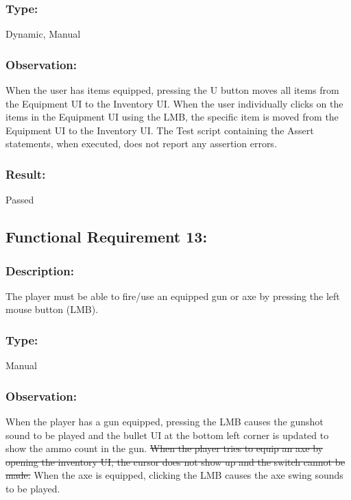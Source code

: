 \documentclass[12pt, titlepage]{article}
\begin{document}
\subsubsection{Type: } Dynamic, Manual

\subsubsection{Observation: } When the user has items equipped, pressing the U button moves all items from the Equipment UI to the Inventory UI. When the user individually clicks on the items in the Equipment UI using the LMB, the specific item is moved from the Equipment UI to the Inventory UI. \newline
The Test script containing the Assert statements, when executed, does not report any assertion errors.

\subsubsection[Pass / Fail:] {Result: } Passed


\subsection{Functional Requirement 13: } 

\subsubsection{Description: }The player must be able to fire/use an equipped gun or axe by pressing the left mouse button (LMB).

\subsubsection{Type: } Manual

\subsubsection{Observation: } When the player has a gun equipped, pressing the LMB causes the gunshot sound to be played and the bullet UI at the bottom left corner is updated to show the ammo count in the gun. \sout{When the player tries to equip an axe by opening the inventory UI, the cursor does not show up and the switch cannot be made.} {\color{magenta} When the axe is equipped, clicking the LMB causes the axe swing sounds to be played.}
\end{document}
